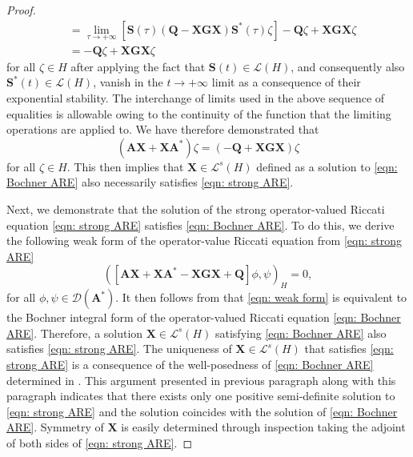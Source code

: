 \documentclass{amsart}
\newcommand{\sL}{\mathscr L}
\newcommand{\p}[1]{\left( {#1} \right)}
\newcommand{\br}[1]{\left[ #1 \right]}
\newcommand{\bA}{\mathbf A}
\newcommand{\bX}{\mathbf X}
\newcommand{\bQ}{\mathbf Q}
\newcommand{\bG}{\mathbf G}
\newcommand{\ARE}{\bA \bX + \bX \bA^* - \bX \bG \bX + \bQ}
\newcommand{\bS}{\mathbf S}
\begin{document}
\begin{proof}
$$\begin{aligned}
    &= \lim_{\tau\rightarrow +\infty} \br{\bS(\tau)\p{\bQ - \bX\bG\bX}\bS^*(\tau)\zeta} - \bQ\zeta + \bX\bG\bX\zeta \\
    &=  - \bQ\zeta + \bX\bG\bX\zeta
\end{aligned}
$$
for all $\zeta \in H$ after applying the fact that $\bS(t) \in \sL(H)$, and consequently also $\bS^*(t) \in \sL(H)$, vanish in the $t\rightarrow +\infty$ limit as a consequence of their exponential stability. The interchange of limits used in the above sequence of equalities is allowable owing to the continuity of the function that the limiting operations are applied to. We have therefore demonstrated that
\begin{equation}
 \label{eqn: inspection}
    \p{\bA\bX + \bX\bA^*}\zeta = \p{-\bQ + \bX\bG\bX}\zeta
\end{equation}
for all $\zeta \in H$. This then implies that $\bX \in \sL^s(H)$ defined as a solution to \eqref{eqn: Bochner ARE} also necessarily satisfies \eqref{eqn: strong ARE}. 

Next, we demonstrate that the solution of the strong operator-valued Riccati equation \eqref{eqn: strong ARE} satisfies \eqref{eqn: Bochner ARE}. To do this, we derive the following weak form of the operator-value Riccati equation from \eqref{eqn: strong ARE}
\begin{equation} \label{eqn: weak form}
    \p{\br{\ARE} \phi, \psi}_H = 0,
\end{equation}
for all $\phi, \psi \in \mathcal D(\bA^*)$. It then follows from \cite[Proposition 4]{cheung2025approximation} that \eqref{eqn: weak form} is equivalent to the Bochner integral form of the operator-valued Riccati equation \eqref{eqn: Bochner ARE}. Therefore, a solution $\bX \in \sL^s(H)$ satisfying \eqref{eqn: Bochner ARE} also satisfies \eqref{eqn: strong ARE}. The uniqueness of $\bX\in\sL^s(H)$ that satisfies \eqref{eqn: strong ARE} is a consequence of the well-posedness of \eqref{eqn: Bochner ARE} determined in \cite{burns2015solutions}. This argument presented in previous paragraph along with this paragraph indicates that there exists only one positive semi-definite solution to \eqref{eqn: strong ARE} and the solution coincides with the solution of \eqref{eqn: Bochner ARE}. Symmetry of $\bX$ is easily determined through inspection taking the adjoint of both sides of \eqref{eqn: strong ARE}. 


\end{proof}
\end{document}
